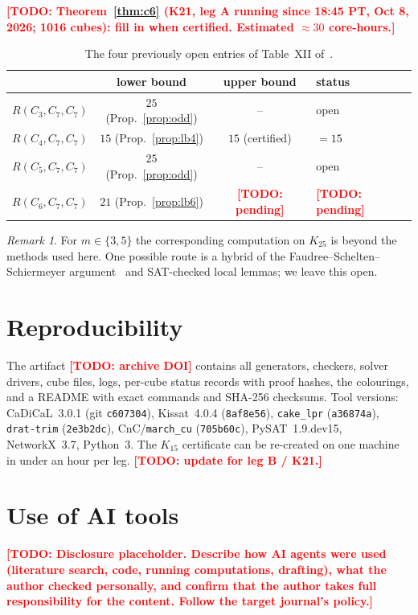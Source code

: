 \documentclass[11pt]{amsart}
\newcommand{\TODO}[1]{\textcolor{red}{\textbf{[TODO: #1]}}}
\theoremstyle{definition}
\theoremstyle{remark}
\newtheorem{remark}[theorem]{Remark}
\begin{document}
\TODO{Theorem~\ref{thm:c6} (K21, leg A running since 18:45 PT, Oct 8, 2026; 1016 cubes): fill in when certified.
Estimated $\approx 30$ core-hours.}

\begin{table}[ht]
\caption{The four previously open entries of Table~XII of~\cite{Rad}.}\label{tab:results}
\begin{tabular}{lccl}
\toprule
 & lower bound & upper bound & status \\
\midrule
$R(C_3,C_7,C_7)$ & $25$ (Prop.~\ref{prop:odd}) & -- & open \\
$R(C_4,C_7,C_7)$ & $15$ (Prop.~\ref{prop:lb4}) & $15$ (certified) & $=15$ \\
$R(C_5,C_7,C_7)$ & $25$ (Prop.~\ref{prop:odd}) & -- & open \\
$R(C_6,C_7,C_7)$ & $21$ (Prop.~\ref{prop:lb6}) & \TODO{pending} & \TODO{pending} \\
\bottomrule
\end{tabular}
\end{table}

\begin{remark}
For $m\in\{3,5\}$ the corresponding computation on $K_{25}$ is beyond the methods used here. One possible route is a hybrid of the
Faudree--Schelten--Schiermeyer argument~\cite{FSS3} and SAT-checked local lemmas; we leave this open.
\end{remark}

\section{Reproducibility}\label{sec:repro}
The artifact \TODO{archive DOI} contains all generators, checkers, solver drivers, cube files, logs, per-cube status records with
proof hashes, the colourings, and a README with exact commands and SHA-256 checksums. Tool versions: CaDiCaL~3.0.1 (git
\texttt{c607304}), Kissat~4.0.4 (\texttt{8af8e56}), \texttt{cake\_lpr} (\texttt{a36874a}), \texttt{drat-trim} (\texttt{2e3b2dc}),
CnC/\texttt{march\_cu} (\texttt{705b60c}), PySAT~1.9.dev15, NetworkX~3.7, Python~3. The $K_{15}$ certificate can be re-created on
one machine in under an hour per leg. \TODO{update for leg B / K21.}

\section*{Use of AI tools}
\TODO{Disclosure placeholder. Describe how AI agents were used (literature search, code, running computations, drafting), what the
author checked personally, and confirm that the author takes full responsibility for the content. Follow the target journal's policy.}
\end{document}
